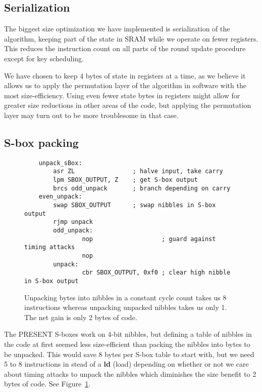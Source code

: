 \documentclass{llncs}
\begin{document}
\subsection{Serialization}
The biggest size optimization we have implemented is serialization of the algorithm, keeping part of the state in SRAM while we operate on fewer registers.
This reduces the instruction count on all parts of the round update procedure except for key scheduling.

We have chosen to keep 4 bytes of state in registers at a time, as we believe it allows us to apply the permutation layer of the algorithm in software with the most size-efficiency.
Using even fewer state bytes in registers might allow for greater size reductions in other areas of the code, but applying the permutation layer may turn out to be more troublesome in that case.

\subsection{S-box packing}
\begin{figure}
\begin{lstlisting}
	unpack_sBox:
		asr ZL                ; halve input, take carry
		lpm SBOX_OUTPUT, Z    ; get S-box output
		brcs odd_unpack       ; branch depending on carry
	even_unpack:
		swap SBOX_OUTPUT      ; swap nibbles in S-box output
		rjmp unpack
        odd_unpack:
                nop                   ; guard against timing attacks
                nop
        unpack:
                cbr SBOX_OUTPUT, 0xf0 ; clear high nibble in S-box output
	\end{lstlisting}
	\caption{Unpacking bytes into nibbles in a constant cycle count takes us 8 instructions whereas unpacking unpacked nibbles takes us only 1. The net gain is only 2 bytes of code.}
\label{unpacking_code}
\end{figure}


The PRESENT S-boxes work on 4-bit nibbles, but defining a table of nibbles in the code at first seemed less size-efficient than packing the nibbles into bytes to be unpacked.
This would save 8 bytes per S-box table to start with, but we need 5 to 8 instructions in stead of a \textbf{ld} (load) depending on whether or not we care about timing attacks to unpack the nibbles which diminishes the size benefit to 2 bytes of code. See Figure~\ref{unpacking_code}.
\end{document}
